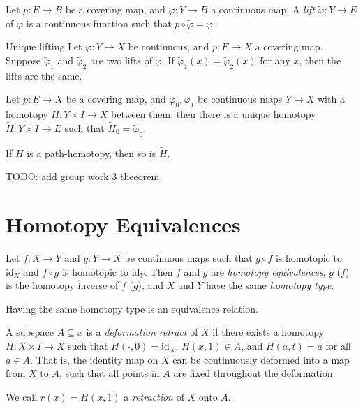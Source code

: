 \begin{defn}
    Let $p: E \to B$ be a covering map, and $\varphi: Y \to B$ a continuous map. A \emph{lift} $\tilde{\varphi}: Y \to E$ of $\varphi$ is a continuous function such that $p \circ \tilde{\varphi} = \varphi$.
\end{defn}

\begin{thm}{Unique lifting}\label{thm:unique-lifting}\proofbreak
    Let $\varphi: Y \to X$ be continuous, and $p: E \to X$ a covering map. Suppose $\tilde{\varphi}_{1}$ and $\tilde{\varphi}_{2}$ are two lifts of $\varphi$. If $\tilde{\varphi}_{1}(x) = \tilde{\varphi}_{2}(x)$ for any $x$, then the lifts are the same.
\end{thm}

\begin{thm}
    Let $p: E \to X$ be a covering map, and $\varphi_{0},\varphi_{1}$ be continuous maps $Y \to X$ with a homotopy $H: Y \times I \to X$ between them, then there is a unique homotopy $\tilde{H}: Y \times I \to E$ such that $\tilde{H}_{0} = \tilde{\varphi}_{0}$.

    If $H$ is a path-homotopy, then so is $\tilde{H}$.
\end{thm}

\begin{thm}
    {\color{red}TODO: add group work 3 theeorem}
\end{thm}

\section{Homotopy Equivalences}

\begin{defn}
    Let $f: X \to Y$ and $g: Y \to X$ be continuous maps such that $g \circ f$ is homotopic to $\textrm{id}_{X}$ and $f \circ g$ is homotopic to $\textrm{id}_{Y}$. Then $f$ and $g$ are \emph{homotopy equivalences}, $g$ ($f$) is the homotopy inverse of $f$ ($g$), and $X$ and $Y$ have the same \emph{homotopy type}.
\end{defn}

\begin{prop}
    Having the same homotopy type is an equivalence relation.
\end{prop}

\begin{defn}
    A subspace $A \subseteq x$ is a \emph{deformation retract} of $X$ if there exists a homotopy $H: X \times I \to X$ such that $H(\cdot, 0) = \textrm{id}_{X}$, $H(x, 1) \in A$, and $H(a, t) = a$ for all $a \in A$. That is, the identity map on $X$ can be continuously deformed into a map from $X$ to $A$, such that all points in $A$ are fixed throughout the deformation.

    We call $r(x) = H(x, 1)$ a \emph{retraction} of $X$ onto $A$.
\end{defn}

